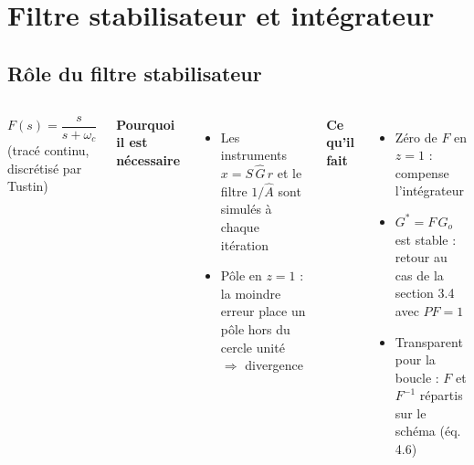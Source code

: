 \section{Filtre stabilisateur et intégrateur}

\subsection*{Rôle du filtre stabilisateur}
\begin{frame}

    \begin{columns}[c]
        \centering
        
        {\scriptsize\color{jvgris} $F(s) = \dfrac{s}{s+\omega_c}$ (tracé continu, discrétisé par Tustin)}

        \textbf{Pourquoi il est nécessaire}
        \begin{itemize}
            \item Les instruments $x = S\,\hat{G}\,r$ et le filtre $1/\hat{A}$ sont simulés à chaque itération
            \item Pôle en $z = 1$ : la moindre erreur place un pôle \alert{hors du cercle unité} $\Rightarrow$ divergence
        \end{itemize}
        \textbf{Ce qu'il fait}
        \begin{itemize}
            \item Zéro de $F$ en $z = 1$ : compense l'intégrateur
            \item $G^* = F\,G_o$ est \alert{stable} : retour au cas de la section 3.4 avec $P\!F = 1$
            \item Transparent pour la boucle : $F$ et $F^{-1}$ répartis sur le schéma (éq. 4.6)
        \end{itemize}
    \end{columns}
\end{frame}

